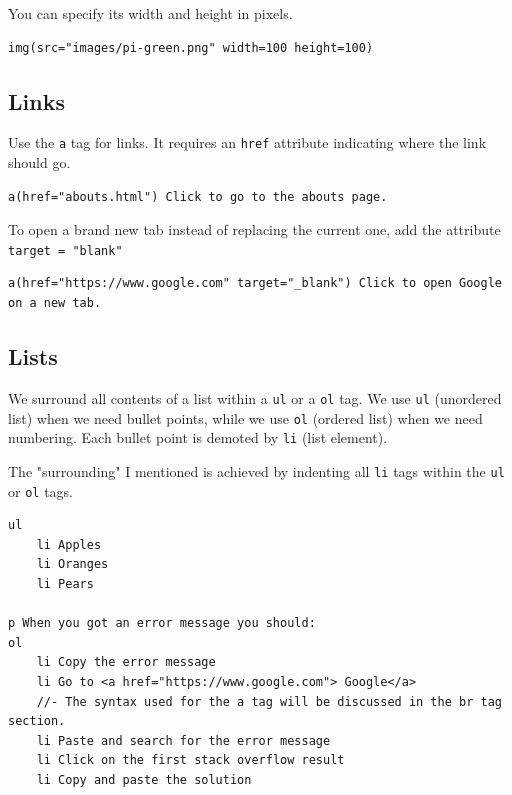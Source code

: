 You can specify its width and height in pixels.

\begin{lstlisting}[language=pug]
img(src="images/pi-green.png" width=100 height=100)
\end{lstlisting}

\subsection{Links}

Use the \texttt{a} tag for links. It requires an \texttt{href} attribute indicating where the link should go.
\vspace{6mm}

\begin{lstlisting}[language=pug]
a(href="abouts.html") Click to go to the abouts page.
\end{lstlisting}

To open a brand new tab instead of replacing the current one, add the attribute \texttt{target = "\textunderscore blank"}
\vspace{6mm}

\begin{lstlisting}[language=pug]
a(href="https://www.google.com" target="_blank") Click to open Google on a new tab.
\end{lstlisting}

\subsection{Lists}

We surround all contents of a list within a \texttt{ul} or a \texttt{ol} tag. We use \texttt{ul} (unordered list) when we need bullet points, while we use \texttt{ol} (ordered list) when we need numbering. Each bullet point is demoted by \texttt{li} (list element).

The "surrounding" I mentioned is achieved by indenting all \texttt{li} tags within the \texttt{ul} or \texttt{ol} tags.
\vspace{6mm}

\begin{lstlisting}[language=pug]
ul
    li Apples
    li Oranges
    li Pears

p When you got an error message you should:
ol
    li Copy the error message
    li Go to <a href="https://www.google.com"> Google</a>
    //- The syntax used for the a tag will be discussed in the br tag section.
    li Paste and search for the error message
    li Click on the first stack overflow result
    li Copy and paste the solution
\end{lstlisting}

